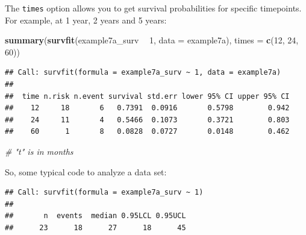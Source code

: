 \documentclass[]{book}
\newenvironment{Shaded}{\begin{snugshade}}{\end{snugshade}}
\newcommand{\CommentTok}[1]{\textcolor[rgb]{0.56,0.35,0.01}{\textit{#1}}}
\newcommand{\DataTypeTok}[1]{\textcolor[rgb]{0.13,0.29,0.53}{#1}}
\newcommand{\DecValTok}[1]{\textcolor[rgb]{0.00,0.00,0.81}{#1}}
\newcommand{\KeywordTok}[1]{\textcolor[rgb]{0.13,0.29,0.53}{\textbf{#1}}}
\newcommand{\NormalTok}[1]{#1}
\newcommand{\OperatorTok}[1]{\textcolor[rgb]{0.81,0.36,0.00}{\textbf{#1}}}
\newcommand{\StringTok}[1]{\textcolor[rgb]{0.31,0.60,0.02}{#1}}
\begin{document}
The \texttt{times} option allows you to get survival probabilities for specific timepoints. For example, at 1 year, 2 years and 5 years:

\begin{Shaded}
\begin{Highlighting}[]
\KeywordTok{summary}\NormalTok{(}\KeywordTok{survfit}\NormalTok{(example7a_surv }\OperatorTok{~}\StringTok{ }\DecValTok{1}\NormalTok{, }\DataTypeTok{data =}\NormalTok{ example7a), }\DataTypeTok{times =} \KeywordTok{c}\NormalTok{(}\DecValTok{12}\NormalTok{, }\DecValTok{24}\NormalTok{, }\DecValTok{60}\NormalTok{))}
\end{Highlighting}
\end{Shaded}

\begin{verbatim}
## Call: survfit(formula = example7a_surv ~ 1, data = example7a)
## 
##  time n.risk n.event survival std.err lower 95% CI upper 95% CI
##    12     18       6   0.7391  0.0916       0.5798        0.942
##    24     11       4   0.5466  0.1073       0.3721        0.803
##    60      1       8   0.0828  0.0727       0.0148        0.462
\end{verbatim}

\begin{Shaded}
\begin{Highlighting}[]
\CommentTok{# "t" is in months}
\end{Highlighting}
\end{Shaded}

So, some typical code to analyze a data set:

\begin{Shaded}
\end{Shaded}

\begin{verbatim}
## Call: survfit(formula = example7a_surv ~ 1)
## 
##       n  events  median 0.95LCL 0.95UCL 
##      23      18      27      18      45
\end{verbatim}
\end{document}
